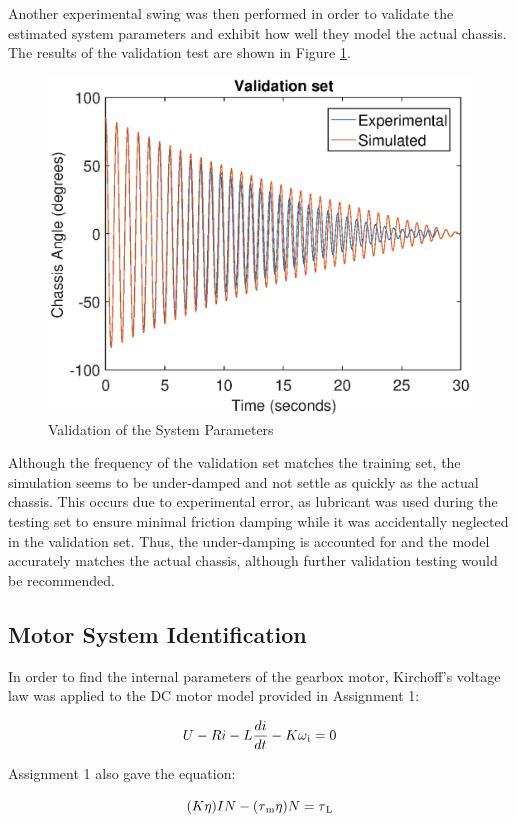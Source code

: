 \documentclass{UoNMCHA}
\numberwithin{equation}{section}
\begin{document}
Another experimental swing was then performed in order to validate the estimated system parameters and exhibit how well they model the actual chassis. The results of the validation test are shown in Figure \ref{validation}.

\begin{figure}[!h]
	\begin{center}
		\includegraphics[width=.6\linewidth]{figs/validationset}
		\caption{Validation of the System Parameters}
		\label{validation}
	\end{center}
\end{figure}

Although the frequency of the validation set matches the training set, the simulation seems to be under-damped and not settle as quickly as the actual chassis. This occurs due to experimental error, as lubricant was used during the testing set to ensure minimal friction damping while it was accidentally neglected in the validation set. Thus, the under-damping is accounted for and the model accurately matches the actual chassis, although further validation testing would be recommended.


\subsection{Motor System Identification}

In order to find the internal parameters of the gearbox motor, Kirchoff's voltage law was applied to the DC motor model provided in Assignment 1: 

\begin{equation}\label{kirchoff}
	U - Ri - L\frac{di}{dt} - K\omega\textsubscript{i} = 0
\end{equation}

Assignment 1 also gave the equation:

\begin{equation}\label{taum}
(K\eta)IN - (\tau\textsubscript{m}\eta)N = \tau\textsubscript{L}
\end{equation}
\end{document}
